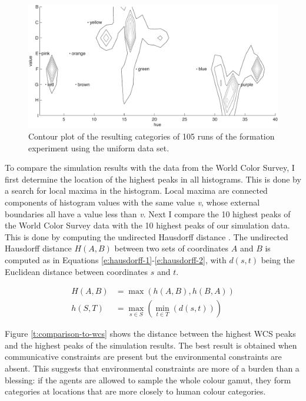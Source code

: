 \begin{figure}[htbp]
\centering
  \includegraphics[width=.85\textwidth]{./experiments/figures/contour-uniform-language}
  \caption{Contour plot of the resulting categories of 105 runs of the
    formation experiment using the uniform data set.}
\label{f:contour-uniform-language}
\end{figure}

To compare the simulation results with the data from the World Color
Survey, I first determine the location of the highest peaks in all
histograms. This is done by a search for local maxima in the
histogram. Local maxima are connected components of histogram values
with the same value \emph{v}, whose external boundaries all have a
value less than \emph{v}. Next I compare the 10 highest peaks of the
World Color Survey data with the 10 highest peaks of our simulation
data. This is done by computing the undirected Hausdorff distance
\citep{rucklidge97efficiently}. The undirected Hausdorff distance
$H(A, B)$ between two sets of coordinates $A$ and $B$ is computed as
in Equations \ref{e:hausdorff-1}-\ref{e:hausdorff-2}, with $d(s, t)$
being the Euclidean distance between coordinates $s$ and $t$.

\begin{align}
H(A, B)& = \max (h(A,B), h(B,A)) 
\label{e:hausdorff-1} \\
h(S, T)& = \max_{s \in S} \left(\min_{t \in T} \left(d\left(s, t\right)\right)\right)
\label{e:hausdorff-2}
\end{align}

Figure \ref{t:comparison-to-wcs} shows the distance between the
highest WCS peaks and the highest peaks of the simulation results. The
best result is obtained when communicative constraints are present but
the environmental constraints are absent. This suggests that
environmental constraints are more of a burden than a blessing:
if the agents are allowed to sample the whole colour gamut, they form
categories at locations that are more closely to human colour
categories.

